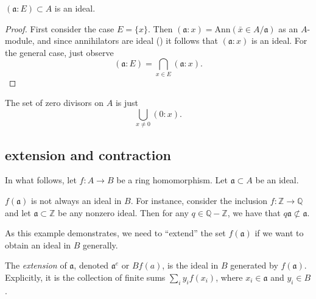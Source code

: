 \documentclass[12pt]{article}
\begin{document}
\begin{corollary}
	$(\mathfrak{a}:E)\subset A$ is an ideal.
\end{corollary}
\begin{proof}
	First consider the case $E=\{x\}$. Then $(\mathfrak{a}:x)=\text{Ann}(\bar{x}\in A/\mathfrak{a})$ as an $A$-module, and since annihilators are ideal () it follows that $(\mathfrak{a}:x)$ is an ideal. For the general case, just observe 
	\begin{equation*}
		(\mathfrak{a}:E) = \bigcap_{x\in E}(\mathfrak{a}:x).
	\end{equation*}
\end{proof}

\begin{example}
	The set of zero divisors on $A$ is just 
	\begin{equation*}
		\bigcup_{x\neq 0} (0:x).
	\end{equation*}
\end{example}


\subsection{extension and contraction} %

In what follows, let $f:A\to B$ be a ring homomorphism. Let $\mathfrak{a}\subset A$ be an ideal.

\begin{example}
	$f(\mathfrak{a})$ is not always an ideal in $B$. For instance, consider the inclusion $f:\mathbb{Z}\to\mathbb{Q}$ and let $\mathfrak{a}\subset\mathbb{Z}$ be any nonzero ideal. Then for any $q\in\mathbb{Q}-\mathbb{Z}$, we have that $q\mathfrak{a}\not\subset\mathfrak{a}$.
\end{example}

As this example demonstrates, we need to ``extend'' the set $f(\mathfrak{a})$ if we want to obtain an ideal in $B$ generally.

\begin{definition}
\label{def_ideal_extension}
	The \emph{extension} of $\mathfrak{a}$, denoted $\mathfrak{a}^e$ or $Bf(a)$, is the ideal in $B$ generated by $f(\mathfrak{a})$. Explicitly, it is the collection of finite sums $\sum_i y_i f(x_i)$, where $x_i\in\mathfrak{a}$ and $y_i\in B$. 
\end{definition}
\end{document}
